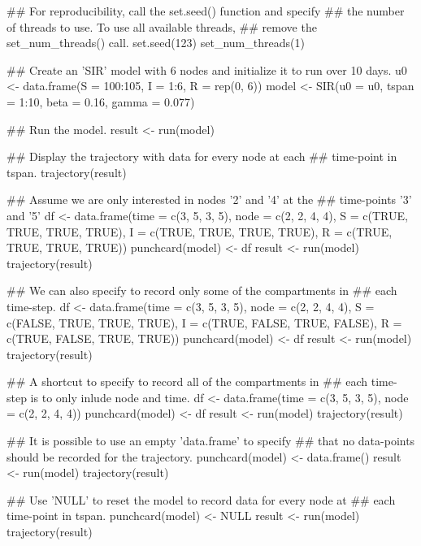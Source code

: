 \documentclass[letterpaper]{book}
\begin{document}
%
\begin{Examples}
\begin{ExampleCode}
## For reproducibility, call the set.seed() function and specify
## the number of threads to use. To use all available threads,
## remove the set_num_threads() call.
set.seed(123)
set_num_threads(1)

## Create an 'SIR' model with 6 nodes and initialize it to run over 10 days.
u0 <- data.frame(S = 100:105, I = 1:6, R = rep(0, 6))
model <- SIR(u0 = u0, tspan = 1:10, beta = 0.16, gamma = 0.077)

## Run the model.
result <- run(model)

## Display the trajectory with data for every node at each
## time-point in tspan.
trajectory(result)

## Assume we are only interested in nodes '2' and '4' at the
## time-points '3' and '5'
df <- data.frame(time = c(3, 5, 3, 5),
                 node = c(2, 2, 4, 4),
                 S = c(TRUE, TRUE, TRUE, TRUE),
                 I = c(TRUE, TRUE, TRUE, TRUE),
                 R = c(TRUE, TRUE, TRUE, TRUE))
punchcard(model) <- df
result <- run(model)
trajectory(result)

## We can also specify to record only some of the compartments in
## each time-step.
df <- data.frame(time = c(3, 5, 3, 5),
                 node = c(2, 2, 4, 4),
                 S = c(FALSE, TRUE, TRUE, TRUE),
                 I = c(TRUE, FALSE, TRUE, FALSE),
                 R = c(TRUE, FALSE, TRUE, TRUE))
punchcard(model) <- df
result <- run(model)
trajectory(result)

## A shortcut to specify to record all of the compartments in
## each time-step is to only inlude node and time.
df <- data.frame(time = c(3, 5, 3, 5),
                 node = c(2, 2, 4, 4))
punchcard(model) <- df
result <- run(model)
trajectory(result)

## It is possible to use an empty 'data.frame' to specify
## that no data-points should be recorded for the trajectory.
punchcard(model) <- data.frame()
result <- run(model)
trajectory(result)

## Use 'NULL' to reset the model to record data for every node at
## each time-point in tspan.
punchcard(model) <- NULL
result <- run(model)
trajectory(result)
\end{ExampleCode}
\end{Examples}
\end{document}

